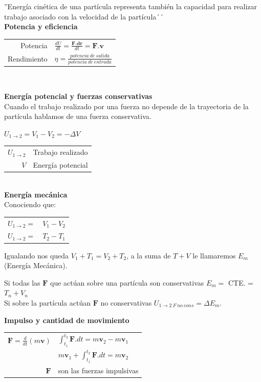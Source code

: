 \documentclass[11pt,a4paper,twocolumn]{article}
\newcommand{\vc}[1]{\textbf{#1}}
\begin{document}
	''Energía cinética de una partícula representa también la capacidad para realizar trabajo asociado con la velocidad de la partícula´´\\
	
	\textbf{Potencia y eficiencia}\\
	\begin{tcolorbox}
		\begin{tabular}{r l}
			Potencia & $\frac{dU}{dt}=\frac{\textbf{F}.\textbf{dr}}{dt}=\vc{F}.\vc{v}$\\
			Rendimiento & $\eta	=\frac{potencia~de~salida}{potencia~de~entrada}$\\
		\end{tabular}\\
	\end{tcolorbox}
	
	\textbf{Energía potencial y fuerzas conservativas}\\
	Cuando el trabajo realizado por una fuerza no depende de la trayectoria de la partícula hablamos de una fuerza conservativa.
		\begin{center}
		$U_{1\rightarrow2}=V_{1}-V_{2} = -\Delta V$
	\end{center}
	\begin{tabular}{r l}
		$U_{1\rightarrow2}$ & Trabajo realizado  \\
		$V$ & Energía potencial\\
	\end{tabular}\\

	\textbf{Energía mecánica}\\
	Conociendo que:\\
	\begin{tabular}{r l}
		$U_{1\rightarrow2}=$&$V_{1}-V_{2}$\\
		$U_{1\rightarrow2}=$&$T_{2}-T_{1}$\\
	\end{tabular}

	Igualando nos queda $V_{1}+T_{1}=V_{2}+T_{2}$, a la suma de $T+V$ le llamaremos $E_{m}$ (Energía Mecánica).\\
	\begin{tcolorbox}
	Si todas las $\vc{F}$ que actúan sobre una partícula son conservativas $E_{m}=$ CTE. = $T_{n}+V_{n}$\\
	Si sobre la partícula actúan $\vc{F}$ no conservativas	$U_{1\rightarrow2~F~no~cons}=\Delta E_{m}$.
	\end{tcolorbox}
	
	\textbf{Impulso y cantidad de movimiento}\\
	\begin{tabular}{r l}
		$\vc{F}=\frac{d}{dt}(m\vc{v})$&$\int_{t_{1}}^{t_{2}} \vc{F}.dt= m \vc{v}_{2} - m \vc{v}_{1}$\\
		&$m \vc{v}_{1}+\int_{t_{1}}^{t_{2}} \vc{F}.dt= m \vc{v}_{2}$\\
		$\vc{F}$& son las fuerzas impulsivas\\
	\end{tabular}
\end{document}
